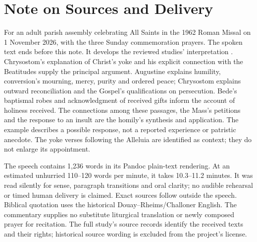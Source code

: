 \section{Note on Sources and Delivery}
For an adult parish assembly celebrating All Saints in the 1962 Roman
Missal on 1 November 2026, with the three Sunday commemoration prayers.
The spoken text ends before this note. It develops the reviewed studies'
interpretation . Chrysostom's explanation of Christ's yoke and his explicit
connection with the Beatitudes supply the principal argument. Augustine
explains humility, conversion's mourning, mercy, purity and ordered
peace; Chrysostom explains outward reconciliation and the Gospel's
qualifications on persecution. Bede's baptismal robes and acknowledgment
of received gifts inform the account of holiness received. The
connections among these passages, the Mass's petitions and the response
to an insult are the homily's synthesis and application. The example
describes a possible response, not a reported experience or patristic
anecdote. The yoke verses following the Alleluia are identified as
context; they do not enlarge its appointment.

The speech contains 1,236 words in its Pandoc plain-text rendering.
At an estimated unhurried 110--120 words per minute, it takes
10.3--11.2 minutes. It was read silently for sense, paragraph transitions
and oral clarity; no audible rehearsal or timed human delivery is
claimed. Exact sources follow outside the speech. Biblical quotation
uses the historical Douay--Rheims/Challoner English. The commentary
supplies no substitute liturgical translation or newly composed prayer
for recitation. The full study's source records identify the received
texts and their rights; historical source wording is excluded from
the project's license.

